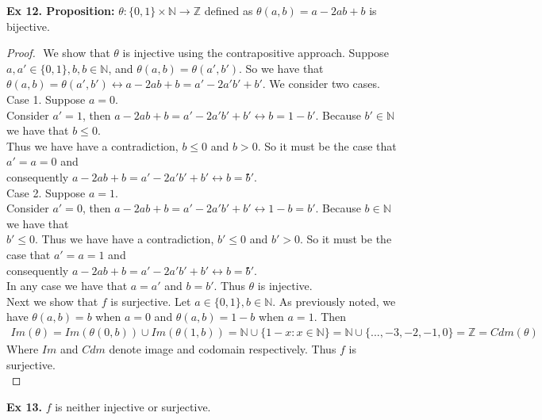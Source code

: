 \documentclass{article}
\begin{document}
\noindent \textbf{Ex 12. Proposition:} $\theta: \{0,1\} \times \mathbb{N} \rightarrow \mathbb{Z}$ defined as $\theta(a, b)=a-2ab+b$ is bijective.
\begin{proof}
$ $\newline
We show that $\theta$ is injective using the contrapositive approach. Suppose $a, a' \in \{0, 1\}, b, b \in \mathbb{N}$, and $\theta(a,b)=\theta(a', b')$. So we have that $\theta(a, b)=\theta(a', b') \leftrightarrow a-2ab+b=a'-2a'b'+b'$. We consider two cases.\\

\noindent Case 1. Suppose $a=0$.\\
\indent Consider $a'=1$, then $a-2ab+b=a'-2a'b'+b' \leftrightarrow b = 1 - b'$. Because $b' \in \mathbb{N}$ we have that $b \leq 0$.\\
\indent Thus we have have a contradiction, $b \leq 0$ and $b > 0$. So it must be the case that $a' = a = 0$ and\\\indent consequently $a-2ab+b=a'-2a'b'+b' \leftrightarrow b = b̈́'$.\\

\noindent Case 2. Suppose $a=1$.\\
\indent Consider $a' = 0$, then $a-2ab+b=a'-2a'b'+b' \leftrightarrow 1-b=b'$. Because $b \in \mathbb{N}$ we have that\\
\indent $b' \leq 0$. Thus we have have a contradiction, $b' \leq 0$ and $b' > 0$. So it must be the case that $a' = a = 1$ and\\
\indent consequently $a-2ab+b=a'-2a'b'+b' \leftrightarrow b = b̈́'$.\\

\noindent In any case we have that $a=a'$ and $b=b'$. Thus $\theta$ is injective.\\

\noindent Next we show that $f$ is surjective. Let $a \in \{0, 1\}, b \in \mathbb{N}$. As previously noted, we have $\theta(a, b)=b$ when $a=0$ and $\theta(a,b)=1-b$ when $a=1$. Then
\begin{align*}
Im(\theta) = Im(\theta(0, b)) \cup Im(\theta(1, b)) = \mathbb{N} \cup \{1-x : x \in \mathbb{N}\} = \mathbb{N} \cup \{...,-3,-2,-1,0\} =\mathbb{Z}=Cdm(\theta)
\end{align*}
Where $Im$ and $Cdm$ denote image and codomain respectively. Thus $f$ is surjective.\\
\end{proof}

\noindent \textbf{Ex 13.} $f$ is neither injective or surjective.\\
\end{document}
